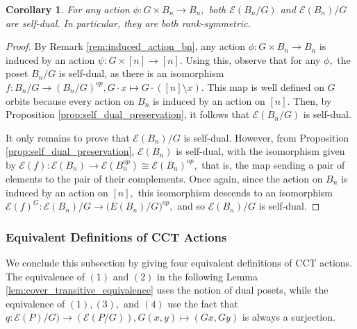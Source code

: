 \documentclass[10 pt]{amsart}
\theoremstyle{plain}
\newtheorem{cor}[thm]{Corollary}
\theoremstyle{definition}
\theoremstyle{remark}
\numberwithin{equation}{section}
\newcommand\sssec{\subsubsection}
\begin{document}
\begin{cor}
\label{cor:duality_bn_quotients}
For any action $\phi:G \times B_n \rightarrow B_n,$ both $\mathcal E(B_n/G)$ and $\mathcal E(B_n)/G$ are self-dual. In particular, they are both rank-symmetric. 
\end{cor}
\begin{proof}
By Remark \ref{rem:induced_action_bn}, any action $\phi:G\times B_n \rightarrow B_n$ is induced by an action $\psi:G \times [n] \rightarrow [n].$ Using this, observe that for any $\phi,$ the poset $B_n/G$ is self-dual, as there is an isomorphism $f:B_n/G \rightarrow (B_n/G)^{op},G \cdot x \mapsto G \cdot ([n] \setminus x).$ This map is well defined on $G$ orbits because every action on $B_n$ is induced by an action on $[n].$ Then, by Proposition \ref{prop:self_dual_preservation}, it follows that $\mathcal E(B_n/G)$ is self-dual.

It only remains to prove that $\mathcal E(B_n)/G$ is self-dual. However, from Proposition \ref{prop:self_dual_preservation}, $\mathcal E(B_n)$ is self-dual, with the isomorphism given by $\mathcal E(f):\mathcal E(B_n) \rightarrow \mathcal E(B_n^{op})\cong \mathcal E(B_n)^{op},$ that is, the map sending a pair of elements to the pair of their complements. Once again, since the action on $B_n$ is induced by an action on $[n],$ this isomorphism descends to an isomorphism $\mathcal E(f)^G:\mathcal E(B_n)/G \rightarrow \mathcal (E(B_n)/G)^{op},$ and so $\mathcal E(B_n)/G$ is self-dual.
\end{proof}

\sssec{Equivalent Definitions of CCT Actions}

We conclude this subsection by giving four equivalent definitions of CCT actions. The equivalence of $(1)$ and $(2)$ in the following Lemma \ref{lem:cover_transitive_equivalence} uses the notion of dual posets, while the equivalence of $(1),(3),$ and $(4)$ use the fact that $q:\mathcal E(P)/G) \rightarrow (\mathcal E(P/G)),G(x,y)\mapsto (Gx,Gy)$ is always a surjection.
\end{document}
